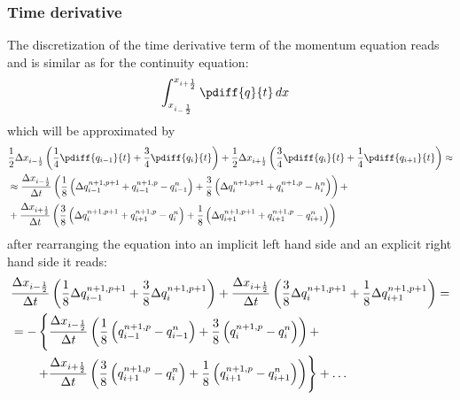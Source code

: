 \subsubsection{Time derivative}
The discretization of the time derivative term of the momentum equation reads and is similar as for the continuity equation:
\begin{align}
    & \int^{x_{i+\half}}_{x_{i_-\half}} \pdiff{q}{t}\, dx
\end{align}
which will be approximated by
\begin{align}
    &\half \Delta x_{i-\half} \left( \frac{1}{4}\pdiff{q_{i-1}}{t} + \frac{3}{4}\pdiff{q_{i}}{t}  \right) +
    \half \Delta x_{i+\half} \left( \frac{3}{4}\pdiff{q_{i}}{t} + \frac{1}{4}\pdiff{q_{i+1}}{t} \right) \approx
    \nonumber \\*
    & \approx
    \frac{\Delta x_{i-\half}}{\Dt} \left(
    \frac{1}{8}\left(\Delta q^{n+1,p+1}_{i-1} + q^{n+1,p}_{i-1} - q^{n}_{i-1} \right) + \frac{3}{8}\left(\Delta q^{n+1,p+1}_{i} + q^{n+1,p}_{i}- h^{n}_{i}\right)
    \right) +
    \nonumber \\*
    & +
    \frac{\Delta x_{i+\half}}{\Dt} \left( \frac{3}{8}\left(\Delta q^{n+1,p+1}_{i} + q^{n+1,p}_{i+1}- q^{n}_{i}\right) +
    \frac{1}{8}\left(\Delta q^{n+1,p+1}_{i+1} + q^{n+1,p}_{i+1}- q^{n}_{i+1}\right)
    \right)
\end{align}
after rearranging the equation into an implicit left hand side and an explicit right hand side  it reads:
\begin{align}
    &  \frac{\Delta x_{i-\frac{1}{2}}}{\Delta t} \left(
    \frac{1}{8}\Delta q^{n+1,p+1}_{i-1} + \frac{3}{8}\Delta q^{n+1,p+1}_{i}
    \right) +
    \frac{\Delta x_{i+\frac{1}{2}}}{\Delta t} \left( \frac{3}{8}\Delta q^{n+1,p+1}_{i} + \frac{1}{8}\Delta q^{n+1,p+1}_{i+1}
    \right) =
    \nonumber \\
    &  = -\left\{
    \frac{\Delta x_{i-\frac{1}{2}}}{\Delta t} \left(
    \frac{1}{8}\left(q^{n+1,p}_{i-1} - q^{n}_{i-1} \right) + \frac{3}{8}\left(q^{n+1,p}_{i}- q^{n}_{i}\right)
    \right) + \right.
    \nonumber \\*
    & \qquad \left. +
    \frac{\Delta x_{i+\frac{1}{2}}}{\Delta t} \left( \frac{3}{8}\left(q^{n+1,p}_{i+1}- q^{n}_{i}\right) + \frac{1}{8}\left(q^{n+1,p}_{i+1}- q^{n}_{i+1}\right)
    \right)\right\}
    + \dots
\end{align}

